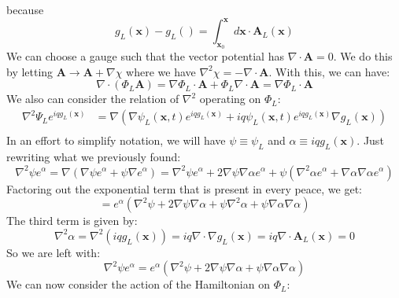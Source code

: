 \documentclass[12pt]{article}
\begin{document}
because
\begin{equation}
  g_L(\mathbf{x}) - g_L() = \int_{\mathbf{x}_0}^{\mathbf{x}} d \mathbf{x} \cdot \mathbf{A}_L(\mathbf{x})
\end{equation}
We can choose a gauge such that the vector potential has $\nabla \cdot \mathbf{A} = 0$. We do this by letting $\mathbf{A} \rightarrow \mathbf{A} + \nabla \chi$ where we have $\nabla^2 \chi = -\nabla \cdot \mathbf{A}$. With this, we can have:
\begin{equation}
  \nabla \cdot (\Phi_L \mathbf{A}) = \nabla \Phi_L \cdot \mathbf{A} + \Phi_L \nabla \cdot \mathbf{A} = \nabla \Phi_L \cdot \mathbf{A}
\end{equation}
We also can consider the relation of $\nabla^2$ operating on $\Phi _L$:
\begin{equation}
\begin{aligned}
  \nabla^2 \Psi_L e^{i q g_L(\mathbf{x})} &= \nabla(\nabla \psi_{L}(\mathbf{x}, t) e^{i q g_{L}(\mathbf{x})} + iq\psi_{L}(\mathbf{x}, t) e^{i q g_{L}(\mathbf{x})} \nabla g_{L}(\mathbf{x}))\\
\end{aligned}
\end{equation}
In an effort to simplify notation, we will have $\psi  \equiv \psi_L $ and $\alpha \equiv i q g_L(\mathbf{x})$.
Just rewriting what we previously found:
\begin{equation}
  \nabla^2 \psi e^{\alpha} = \nabla(\nabla \psi e^{\alpha} + \psi \nabla e^{\alpha}) = \nabla^2 \psi e^{\alpha} + 2 \nabla\psi \nabla\alpha e^{\alpha} + \psi (\nabla^2 \alpha e^{\alpha} + \nabla \alpha \nabla \alpha e^{\alpha}) 
\end{equation}
Factoring out the exponential term that is present in every peace, we get:
\begin{equation}
  = e^{\alpha} \left( \nabla^2 \psi + 2 \nabla \psi \nabla \alpha + \psi \nabla^2 \alpha + \psi \nabla \alpha \nabla \alpha \right)
\end{equation}
The third term is given by:
\begin{equation}
  \nabla^2 \alpha = \nabla^2 (i q g_L(\mathbf{x})) = i q \nabla \cdot \nabla g_L(\mathbf{x}) = i q \nabla \cdot \mathbf{A}_L(\mathbf{x}) = 0
\end{equation}
So we are left with:
\begin{equation}
  \nabla^2 \psi e^{\alpha} = e^{\alpha} \left( \nabla^2 \psi + 2 \nabla \psi \nabla \alpha + \psi \nabla \alpha \nabla \alpha \right)
\end{equation}
We can now consider the action of the Hamiltonian on $\Phi_L$:
\end{document}
